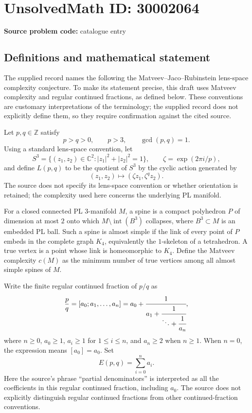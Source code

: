 \documentclass[11pt]{article}
\newcommand{\Z}{\mathbb{Z}}
\newcommand{\C}{\mathbb{C}}
\begin{document}
\section*{UnsolvedMath ID: 30002064}
\textbf{Source problem code:} catalogue entry
\subsection{Definitions and mathematical statement}
The supplied record names the following the Matveev--Jaco--Rubinstein lens-space complexity conjecture. To make its statement precise, this draft uses Matveev complexity and regular continued fractions, as defined below. These conventions are customary interpretations of the terminology; the supplied record does not explicitly define them, so they require confirmation against the cited source.

Let \(p,q\in\Z\) satisfy
\[
 p>q>0,\qquad p>3,\qquad \gcd(p,q)=1.
\]
Using a standard lens-space convention, let
\[
 S^3=\{(z_1,z_2)\in\C^2:|z_1|^2+|z_2|^2=1\},
 \qquad \zeta=\exp(2\pi i/p),
\]
and define \(L(p,q)\) to be the quotient of \(S^3\) by the cyclic action generated by
\[
 (z_1,z_2)\longmapsto(\zeta z_1,\zeta^q z_2).
\]
The source does not specify its lens-space convention or whether orientation is retained; the complexity used here concerns the underlying PL manifold.

For a closed connected PL \(3\)-manifold \(M\), a spine is a compact polyhedron \(P\) of dimension at most \(2\) onto which \(M\setminus\operatorname{int}(B^3)\) collapses, where \(B^3\subset M\) is an embedded PL ball. Such a spine is almost simple if the link of every point of \(P\) embeds in the complete graph \(K_4\), equivalently the \(1\)-skeleton of a tetrahedron. A true vertex is a point whose link is homeomorphic to \(K_4\). Define the Matveev complexity \(c(M)\) as the minimum number of true vertices among all almost simple spines of \(M\).

Write the finite regular continued fraction of \(p/q\) as
\[
 \frac pq=[a_0;a_1,\ldots,a_n]
 =a_0+\cfrac{1}{a_1+\cfrac{1}{\ddots+\cfrac{1}{a_n}}},
\]
where \(n\geq0\), \(a_0\geq1\), \(a_i\geq1\) for \(1\leq i\leq n\), and \(a_n\geq2\) when \(n\geq1\). When \(n=0\), the expression means \([a_0]=a_0\). Set
\[
 E(p,q)=\sum_{i=0}^{n}a_i.
\]
Here the source's phrase ``partial denominators'' is interpreted as all the coefficients in this regular continued fraction, including \(a_0\). The source does not explicitly distinguish regular continued fractions from other continued-fraction conventions.
\end{document}

